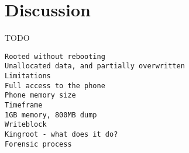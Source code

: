\section{Discussion}
\lipsum[1-2]
TODO
\begin{verbatim}
Rooted without rebooting
Unallocated data, and partially overwritten
Limitations
Full access to the phone
Phone memory size
Timeframe
1GB memory, 800MB dump
Writeblock
Kingroot - what does it do?
Forensic process
\end{verbatim}